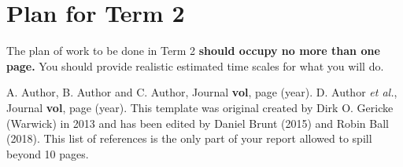 \documentclass[a4paper,12pt, notitlepage]{article}
\begin{document}
\section{Plan for Term 2}
The plan of work to be done in Term 2 \textbf{should occupy no more than one page.} You should provide realistic estimated time scales for what you will do. 

\begin{thebibliography}{99}

\setlength{\itemsep}{-2mm}

 A. Author, B. Author and C. Author,
                  Journal {\bf vol}, page (year).
 D. Author {\em et al.},
                  Journal {\bf vol}, page (year).
 This template was original created by Dirk O. Gericke (Warwick) in 2013 and has been edited by Daniel Brunt (2015) and Robin Ball (2018).
 This list of references is the only part of your report allowed to spill beyond 10 pages.
\end{thebibliography}
\end{document}
